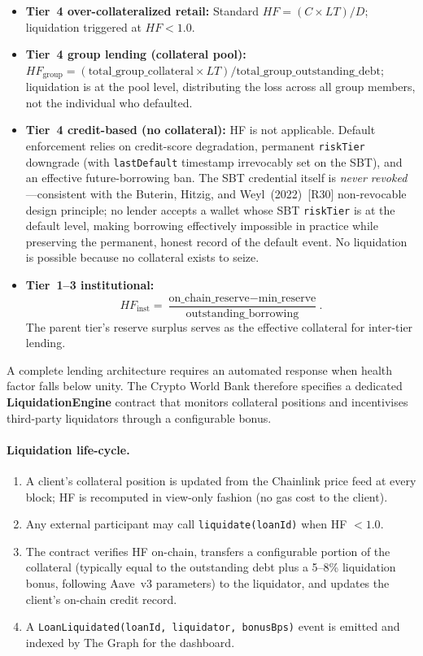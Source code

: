 \documentclass[12pt,a4paper]{report}
\begin{document}
\begin{itemize}[noitemsep]
\item \textbf{Tier~4 over-collateralized retail:} Standard $HF = (C \times LT) / D$; liquidation triggered at $HF < 1.0$.
\item \textbf{Tier~4 group lending (collateral pool):} $HF_{\text{group}} = (\text{total\_group\_collateral} \times LT) / \text{total\_group\_outstanding\_debt}$; liquidation is at the pool level, distributing the loss across all group members, not the individual who defaulted.
\item \textbf{Tier~4 credit-based (no collateral):} HF is not applicable. Default enforcement relies on credit-score degradation, permanent \texttt{riskTier} downgrade (with \texttt{lastDefault} timestamp irrevocably set on the SBT), and an effective future-borrowing ban. The SBT credential itself is \textit{never revoked}---consistent with the Buterin, Hitzig, and Weyl~(2022)~[R30] non-revocable design principle; no lender accepts a wallet whose SBT \texttt{riskTier} is at the default level, making borrowing effectively impossible in practice while preserving the permanent, honest record of the default event. No liquidation is possible because no collateral exists to seize.
\item \textbf{Tier~1--3 institutional:}
\[
HF_{\text{inst}} = \frac{\text{on\_chain\_reserve} - \text{min\_reserve}}{\text{outstanding\_borrowing}}.
\]
The parent tier's reserve surplus serves as the effective collateral for inter-tier lending.
\end{itemize}

A complete lending architecture requires an automated response when health factor falls below unity. The Crypto World Bank therefore specifies a dedicated \textbf{LiquidationEngine} contract that monitors collateral positions and incentivises third-party liquidators through a configurable bonus.

\paragraph{Liquidation life-cycle.}
\begin{enumerate}[noitemsep]
\item A client's collateral position is updated from the Chainlink price feed at every block; HF is recomputed in view-only fashion (no gas cost to the client).
\item Any external participant may call \texttt{liquidate(loanId)} when HF $< 1.0$.
\item The contract verifies HF on-chain, transfers a configurable portion of the collateral (typically equal to the outstanding debt plus a 5--8\% liquidation bonus, following Aave~v3 parameters) to the liquidator, and updates the client's on-chain credit record.
\item A \texttt{LoanLiquidated(loanId, liquidator, bonusBps)} event is emitted and indexed by The Graph for the dashboard.
\end{enumerate}
\end{document}
